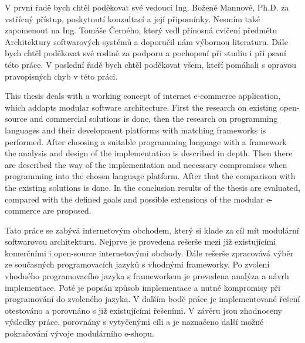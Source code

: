 \documentclass[11pt,twoside,a4paper]{book}
\begin{document}
\acknowledgements
\noindent
V první řadě bych chtěl poděkovat své vedoucí Ing. Boženě Mannové, Ph.D. za vstřícný přístup, poskytnutí konzultací a její připomínky. Nesmím také zapomenout na Ing. Tomáše Černého, který vedl přínosná cvičení předmětu Architektury softwarových systémů a doporučil nám výbornou literaturu. Dále bych chtěl poděkovat své rodině za podporu a pochopení při studiu i při psaní této práce. V poslední řadě bych chtěl poděkovat všem, kteří pomáhali s opravou pravopisných chyb v této práci.





 
\abstractpage
This thesis deals with a working concept of internet e-commerce application, which addapts modular software architecture.  First the research on existing open-source and commercial solutions is done, then the research on programming languages and their development platforms with matching frameworks is performed. After choosing a suitable programming language with a framework the analysis and design of the implementation is described in depth. Then there are described the way of the implementation and necessary compromises when programming into the chosen language platform. After that the comparison with the existing solutions is done. In the conclusion results of the thesis are evaluated, compared with the defined goals and possible extensions of the modular e-commerce are proposed.



\baselineskip

\noindent
Tato práce se zabývá internetovým obchodem, který si klade za cíl mít modulární softwarovou architekturu. Nejprve je provedena rešerše mezi již existujícími komerčními i open-source internetovými obchody. Dále rešerše zpracovává výběr ze současných programovacích jazyků s vhodnými frameworky. Po zvolení vhodného programovacího jazyka s frameworkem je provedena analýza a návrh implementace. Poté je popsán způsob implementace a nutné kompromisy při programování do zvoleného jazyka. V dalším bodě práce je implementované řešení otestováno a porovnáno s již existujícími řešeními. V závěru jsou zhodnoceny výsledky práce, porovnány s vytyčenými cíli a je naznačeno další možné pokračování vývoje modulárního e-shopu.
\end{document}
